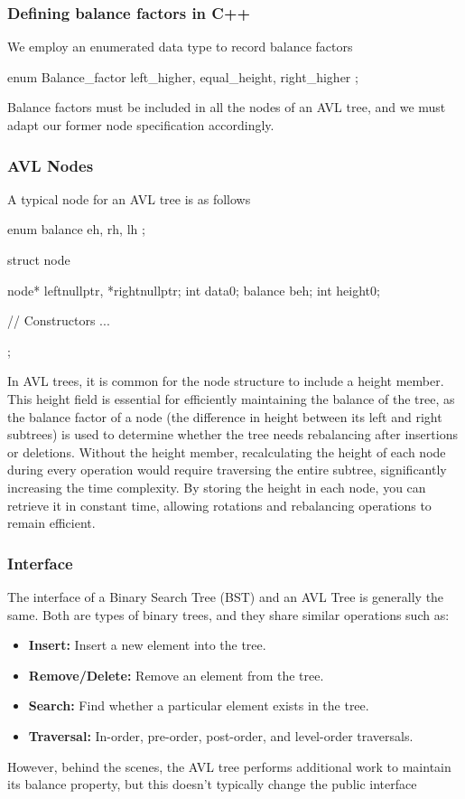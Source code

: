 \documentclass{report}
\begin{document}
\pagebreak 
\subsubsection{Defining balance factors in C++}
\bigbreak \noindent 
We employ an enumerated data type to record balance factors
\bigbreak \noindent 
\begin{cppcode}
    enum Balance_factor { left_higher, equal_height, right_higher };
\end{cppcode}
\bigbreak \noindent 
Balance factors must be included in all the nodes of an AVL tree, and we must adapt our former node specification accordingly.

\bigbreak \noindent 
\subsubsection{AVL Nodes}
\bigbreak \noindent 
A typical node for an AVL tree is as follows
\bigbreak \noindent 
\begin{cppcode}
    enum balance {
        eh, rh, lh
    };

    struct node {
        node* left{nullptr}, *right{nullptr};
        int data{0};
        balance b{eh};
        int height{0};

        // Constructors
            ... 
    };
\end{cppcode}
\bigbreak \noindent 
In AVL trees, it is common for the node structure to include a height member. This height field is essential for efficiently maintaining the balance of the tree, as the balance factor of a node (the difference in height between its left and right subtrees) is used to determine whether the tree needs rebalancing after insertions or deletions.
\bigbreak \noindent 
Without the height member, recalculating the height of each node during every operation would require traversing the entire subtree, significantly increasing the time complexity. By storing the height in each node, you can retrieve it in constant time, allowing rotations and rebalancing operations to remain efficient.

\pagebreak 
\subsubsection{Interface}
\bigbreak \noindent 
The interface of a Binary Search Tree (BST) and an AVL Tree is generally the same. Both are types of binary trees, and they share similar operations such as:
\begin{itemize}
    \item \textbf{Insert:} Insert a new element into the tree.
    \item \textbf{Remove/Delete:} Remove an element from the tree.
    \item \textbf{Search:} Find whether a particular element exists in the tree.
    \item \textbf{Traversal:} In-order, pre-order, post-order, and level-order traversals.
\end{itemize}
However, behind the scenes, the AVL tree performs additional work to maintain its balance property, but this doesn't typically change the public interface
\end{document}
